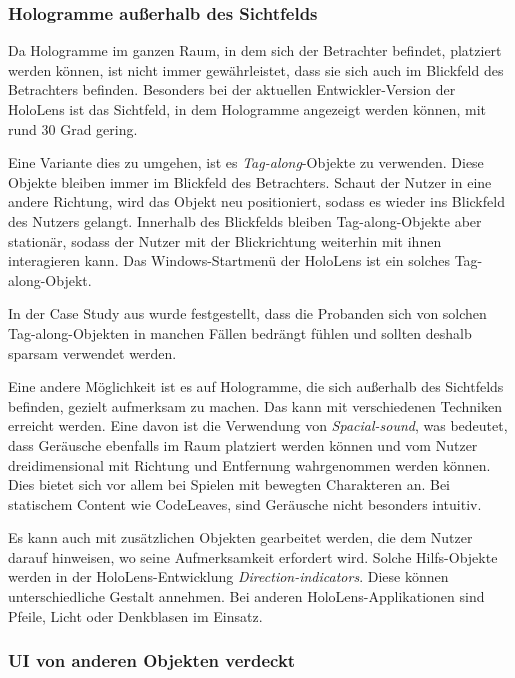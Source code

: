 \subsubsection*{Hologramme außerhalb des Sichtfelds}

Da Hologramme im ganzen Raum, in dem sich der Betrachter befindet, platziert werden können, ist nicht immer gewährleistet, dass sie sich auch im Blickfeld des Betrachters befinden. Besonders bei der aktuellen Entwickler-Version der HoloLens ist das Sichtfeld, in dem Hologramme angezeigt werden können, mit rund 30 Grad \cite{czerulla2017microsoft} gering.

Eine Variante dies zu umgehen, ist es \textit{Tag-along}-Objekte zu verwenden. Diese Objekte bleiben immer im Blickfeld des Betrachters. Schaut der Nutzer in eine andere Richtung, wird das Objekt neu positioniert, sodass es wieder ins Blickfeld des Nutzers gelangt. Innerhalb des Blickfelds bleiben Tag-along-Objekte aber stationär, sodass der Nutzer mit der Blickrichtung weiterhin mit ihnen interagieren kann. Das Windows-Startmenü der HoloLens ist ein solches Tag-along-Objekt.

In der Case Study aus \cite{windows2017casestudy3} wurde festgestellt, dass die Probanden sich von solchen Tag-along-Objekten in manchen Fällen bedrängt fühlen und sollten deshalb sparsam verwendet werden.

Eine andere Möglichkeit ist es auf Hologramme, die sich außerhalb des Sichtfelds befinden, gezielt aufmerksam zu machen. Das kann mit verschiedenen Techniken erreicht werden. Eine davon ist die Verwendung von \textit{Spacial-sound}, was bedeutet, dass Geräusche ebenfalls im Raum platziert werden können und vom Nutzer dreidimensional mit Richtung und Entfernung wahrgenommen werden können. Dies bietet sich vor allem bei Spielen mit bewegten Charakteren an. Bei statischem Content wie CodeLeaves, sind Geräusche nicht besonders intuitiv.

Es kann auch mit zusätzlichen Objekten gearbeitet werden, die dem Nutzer darauf hinweisen, wo seine Aufmerksamkeit erfordert wird. Solche Hilfs-Objekte werden in der HoloLens-Entwicklung \textit{Direction-indicators}. Diese können unterschiedliche Gestalt annehmen. Bei anderen HoloLens-Applikationen sind Pfeile, Licht oder Denkblasen im Einsatz.

\subsubsection*{UI von anderen Objekten verdeckt}

